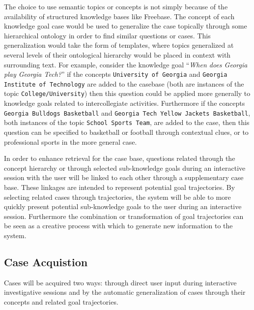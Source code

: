 \documentclass[11pt,letterpaper]{article}
\begin{document}
The choice to use semantic topics or concepts is not simply because of the availability of structured knowledge bases like Freebase. The concept of each knowledge goal case would be used to generalize the case topically through some hierarchical ontology in order to find similar questions or cases. This generalization would take the form of templates, where topics generalized at several levels of their ontological hierarchy would be placed in context with surrounding text. For example, consider the knowledge goal ``\textit{When does Georgia play Georgia Tech?}'' if the concepts \texttt{University of Georgia} and \texttt{Georgia Institute of Technology} are added to the casebase (both are instances of the topic \texttt{College/University}) then this question could be applied more generally to knowledge goals related to intercollegiate activities. Furthermore if the concepts \texttt{Georgia Bulldogs Basketball} and \texttt{Georgia Tech Yellow Jackets Basketball}, both instances of the topic \texttt{School Sports Team}, are added to the case, then this question can be specified to basketball or football through contextual clues, or to professional sports in the more general case.

In order to enhance retrieval for the case base, questions related through the concept hierarchy or through selected sub-knowledge goals during an interactive session with the user will be linked to each other through a supplementary case base. These linkages are intended to represent potential goal trajectories. By selecting related cases through trajectories, the system will be able to more quickly present potential sub-knowledge goals to the user during an interactive session. Furthermore the combination or transformation of goal trajectories can be seen as a creative process with which to generate new information to the system.

\subsection{Case Acquistion}

Cases will be acquired two ways: through direct user input during interactive investigative sessions and by the automatic generalization of cases through their concepts and related goal trajectories.
\end{document}
